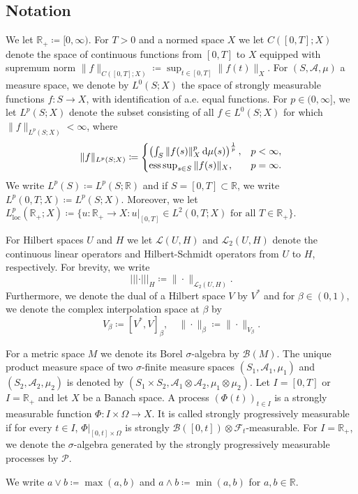 \documentclass{amsart}
\newcommand{\dd}{\,\mathrm{d}}
\newcommand{\UH}{\mathcal{L}_2(U,H)}
\newcommand{\<}{\langle}
\newcommand{\?}{\rangle}
\newcommand{\nn}{|\!|\!|}
\DeclareMathOperator*{\esssup}{\textup{ess\,sup}}
\theoremstyle{plain}
\theoremstyle{remark}
\theoremstyle{plain}
\numberwithin{equation}{section}
\def\R{{\mathbb R}}
\newcommand{\BB}{\mathcal{B}}
\newcommand{\F}{\mathcal{F}}
\newcommand{\PP}{\mathcal{P}}
\newcommand{\Om}{\Omega}
\begin{document}
\subsection*{Notation}
We let $\R_+\coloneqq [0,\infty)$.
For $T>0$ and a normed space $X$ we let $C([0,T];X)$ denote the space of continuous functions from $[0,T]$ to $X$ equipped with supremum norm $\|f\|_{C([0,T];X)}\coloneqq \sup_{t\in[0,T]}\|f(t)\|_X$. For $(S,\mathcal{A},\mu)$ a measure space, we denote by $L^0(S;X)$ the space of strongly measurable functions $f\colon S\to X$, with identification of a.e. \!equal functions. For $p\in (0,\infty]$, we let $L^p(S;X)$ denote the subset consisting of all  $f\in L^0(S;X)$ for which $\|f\|_{L^p(S;X)}<\infty$, where
\[
\|f\|_{L^p(S;X)}\coloneqq
\begin{cases}
\left(\int_S\|f(s)\|_X^p \dd \mu(s)\right)^{\frac{1}{p}}, & p<\infty,\\
\esssup_{s\in S}\|f(s)\|_X, & p=\infty.
\end{cases}
\]
We write $L^p(S)\coloneqq L^p(S;\R)$ and if $S=[0,T]\subset \R$, we write $L^p(0,T;X)\coloneqq L^p(S;X)$. Moreover, we let $L^p_{\mathrm{loc}}(\R_+;X)\coloneqq \{u\colon \R_+\to X : u|_{[0,T]}\in L^2(0,T;X) \text{ for all } T\in \R_+\}$.

For Hilbert spaces $U$ and $H$ we let $\mathcal{L}(U,H)$ and $\UH$ denote the continuous linear operators and Hilbert-Schmidt operators from $U$ to $H$, respectively.
For brevity, we write
\[
\nn \cdot\nn_H\coloneqq \|\cdot\|_{\UH}.
\]
Furthermore, we denote the dual of a Hilbert space $V$ by $V^*$ and for $\beta\in(0,1)$, we denote the complex interpolation space at $\beta$ by
\[
V_\beta\coloneqq [V^*,V]_\beta, \quad \|\cdot\|_\beta\coloneqq \|\cdot\|_{V_{\beta}}.
\]

For a metric space $M$ we denote its Borel $\sigma$-algebra by $\BB(M)$. The unique product measure space of two $\sigma$-finite measure spaces $(S_1,\mathcal{A}_1,\mu_1)$ and $(S_2,\mathcal{A}_2,\mu_2)$ is denoted by $(S_1\times S_2,\mathcal{A}_1\otimes \mathcal{A}_2,\mu_1\otimes\mu_2)$.
Let $I=[0,T]$ or $I=\R_+$ and let $X$ be a Banach space. A process $(\Phi(t))_{t\in I}$ is a strongly measurable function $\Phi\colon I\times\Om\to X$. It is called strongly
progressively measurable if for every $t \in I$, $\Phi|_{[0,t]\times \Om}$ is strongly $\mathcal{B}([0, t]) \otimes \F_t$-measurable.  For  $I=\R_+$, we denote the
$\sigma$-algebra generated by the strongly progressively measurable processes by $\PP$.

We write $a\vee b\coloneqq \max(a,b)$ and $a\wedge b\coloneqq \min(a,b)$ for $a,b\in\R$.
\end{document}
